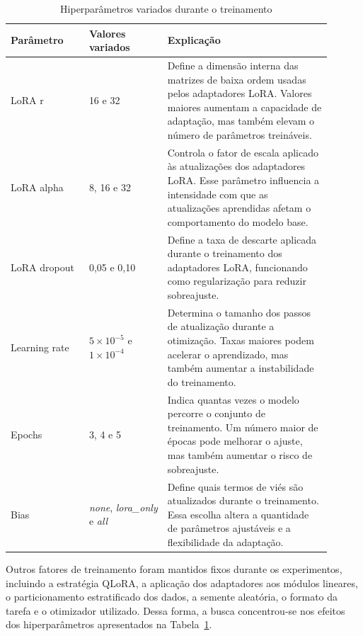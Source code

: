\documentclass[conference]{IEEEtran}
\begin{document}
\begin{table}[!htbp]
\centering
\caption{Hiperparâmetros variados durante o treinamento}
\label{tab:hiperparametros-treinamento}

\small
\begin{tabular}{p{0.22\linewidth} p{0.22\linewidth} p{0.46\linewidth}}
\toprule
\textbf{Parâmetro} & \textbf{Valores variados} & \textbf{Explicação} \\
\midrule
LoRA r & 16 e 32 & Define a dimensão interna das matrizes de baixa ordem usadas pelos adaptadores LoRA. Valores maiores aumentam a capacidade de adaptação, mas também elevam o número de parâmetros treináveis. \\

LoRA alpha & 8, 16 e 32 & Controla o fator de escala aplicado às atualizações dos adaptadores LoRA. Esse parâmetro influencia a intensidade com que as atualizações aprendidas afetam o comportamento do modelo base. \\

LoRA dropout & 0{,}05 e 0{,}10 & Define a taxa de descarte aplicada durante o treinamento dos adaptadores LoRA, funcionando como regularização para reduzir sobreajuste. \\

Learning rate & \(5 \times 10^{-5}\) e \(1 \times 10^{-4}\) & Determina o tamanho dos passos de atualização durante a otimização. Taxas maiores podem acelerar o aprendizado, mas também aumentar a instabilidade do treinamento. \\

Epochs & 3, 4 e 5 & Indica quantas vezes o modelo percorre o conjunto de treinamento. Um número maior de épocas pode melhorar o ajuste, mas também aumentar o risco de sobreajuste. \\

Bias & \emph{none}, \emph{lora\_only} e \emph{all} & Define quais termos de viés são atualizados durante o treinamento. Essa escolha altera a quantidade de parâmetros ajustáveis e a flexibilidade da adaptação. \\
\bottomrule
\end{tabular}
\end{table}

Outros fatores de treinamento foram mantidos fixos durante os experimentos, incluindo a estratégia QLoRA, a aplicação dos adaptadores aos módulos lineares, o particionamento estratificado dos dados, a semente aleatória, o formato da tarefa e o otimizador utilizado. Dessa forma, a busca concentrou-se nos efeitos dos hiperparâmetros apresentados na Tabela~\ref{tab:hiperparametros-treinamento}.
\end{document}
